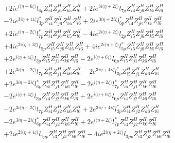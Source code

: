 \begin{align}
 &+2 i e^{i \Big(\eta +6 \zeta \Big)} l_{6p} Z_{{i 4}}^{H} Z_{{j 6}}^{H} Z_{{k 5}}^{H} Z_{{l 6}}^{H} +2 i e^{3 i \Big(\eta +2 \zeta \Big)} l_{7p} Z_{{i 4}}^{H} Z_{{j 6}}^{H} Z_{{k 5}}^{H} Z_{{l 6}}^{H} \nonumber \\ 
 &-2 i e^{3 i \eta +4 i \zeta } l_{3p}^* Z_{{i 4}}^{H} Z_{{j 6}}^{H} Z_{{k 5}}^{H} Z_{{l 6}}^{H} +2 i e^{3 i \eta +2 i \zeta } l_{6p}^* Z_{{i 4}}^{H} Z_{{j 6}}^{H} Z_{{k 5}}^{H} Z_{{l 6}}^{H} \nonumber \\ 
 &+2 i e^{i \Big(\eta +2 \zeta \Big)} l_{7p}^* Z_{{i 4}}^{H} Z_{{j 6}}^{H} Z_{{k 5}}^{H} Z_{{l 6}}^{H} -4 i e^{2 i \Big(\eta +2 \zeta \Big)} l_{2p} Z_{{i 5}}^{H} Z_{{j 6}}^{H} Z_{{k 5}}^{H} Z_{{l 6}}^{H} \nonumber \\ 
 &+4 i e^{2 i \Big(\eta +3 \zeta \Big)} l_{5p} Z_{{i 5}}^{H} Z_{{j 6}}^{H} Z_{{k 5}}^{H} Z_{{l 6}}^{H} +4 i e^{2 i \Big(\eta +\zeta \Big)} l_{5p}^* Z_{{i 5}}^{H} Z_{{j 6}}^{H} Z_{{k 5}}^{H} Z_{{l 6}}^{H} \nonumber \\ 
 &+2 e^{i \Big(\eta +4 \zeta \Big)} l_{3p} Z_{{i 5}}^{H} Z_{{j 1}}^{H} Z_{{k 6}}^{H} Z_{{l 6}}^{H} -2 e^{i \Big(\eta +6 \zeta \Big)} l_{6p} Z_{{i 5}}^{H} Z_{{j 1}}^{H} Z_{{k 6}}^{H} Z_{{l 6}}^{H} \nonumber \\ 
 &+2 e^{3 i \Big(\eta +2 \zeta \Big)} l_{7p} Z_{{i 5}}^{H} Z_{{j 1}}^{H} Z_{{k 6}}^{H} Z_{{l 6}}^{H} -2 e^{3 i \eta +4 i \zeta } l_{3p}^* Z_{{i 5}}^{H} Z_{{j 1}}^{H} Z_{{k 6}}^{H} Z_{{l 6}}^{H} \nonumber \\ 
 &+2 e^{3 i \eta +2 i \zeta } l_{6p}^* Z_{{i 5}}^{H} Z_{{j 1}}^{H} Z_{{k 6}}^{H} Z_{{l 6}}^{H} -2 e^{i \Big(\eta +2 \zeta \Big)} l_{7p}^* Z_{{i 5}}^{H} Z_{{j 1}}^{H} Z_{{k 6}}^{H} Z_{{l 6}}^{H} \nonumber \\ 
 &-2 e^{i \Big(\eta +4 \zeta \Big)} l_{3p} Z_{{i 4}}^{H} Z_{{j 2}}^{H} Z_{{k 6}}^{H} Z_{{l 6}}^{H} +2 e^{i \Big(\eta +6 \zeta \Big)} l_{6p} Z_{{i 4}}^{H} Z_{{j 2}}^{H} Z_{{k 6}}^{H} Z_{{l 6}}^{H} \nonumber \\ 
 &-2 e^{3 i \Big(\eta +2 \zeta \Big)} l_{7p} Z_{{i 4}}^{H} Z_{{j 2}}^{H} Z_{{k 6}}^{H} Z_{{l 6}}^{H} +2 e^{3 i \eta +4 i \zeta } l_{3p}^* Z_{{i 4}}^{H} Z_{{j 2}}^{H} Z_{{k 6}}^{H} Z_{{l 6}}^{H} \nonumber \\ 
 &-2 e^{3 i \eta +2 i \zeta } l_{6p}^* Z_{{i 4}}^{H} Z_{{j 2}}^{H} Z_{{k 6}}^{H} Z_{{l 6}}^{H} +2 e^{i \Big(\eta +2 \zeta \Big)} l_{7p}^* Z_{{i 4}}^{H} Z_{{j 2}}^{H} Z_{{k 6}}^{H} Z_{{l 6}}^{H} \nonumber \\ 
 &+2 i e^{2 i \Big(\eta +4 \zeta \Big)} l_{1pp} Z_{{i 3}}^{H} Z_{{j 3}}^{H} Z_{{k 6}}^{H} Z_{{l 6}}^{H} -4 i e^{2 i \Big(\eta +2 \zeta \Big)} l_{3pp} Z_{{i 3}}^{H} Z_{{j 3}}^{H} Z_{{k 6}}^{H} Z_{{l 6}}^{H} \nonumber \\ 

\end{align}

